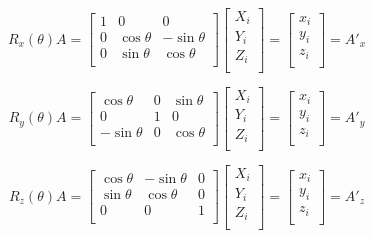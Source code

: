 \documentclass[12pt,a4paper]{article}
\begin{document}
\begin{equation}
R_{x}(\theta) A =
\begin{bmatrix}
1&0&0\\
0&\cos \theta&- \sin \theta \\
0&\sin \theta& \cos \theta \\
\end{bmatrix}
\begin{bmatrix}
X_i\\
Y_i\\
Z_i\\
\end{bmatrix}
=
\begin{bmatrix}
x_i\\
y_i\\
z_i\\
\end{bmatrix}
= A'_x
\end{equation}

\begin{equation}
R_{y}(\theta) A =
\begin{bmatrix}
\cos \theta&0& \sin \theta \\
0&1&0\\
-\sin \theta&0& \cos \theta \\
\end{bmatrix}
\begin{bmatrix}
X_i\\
Y_i\\
Z_i\\
\end{bmatrix}
=
\begin{bmatrix}
x_i\\
y_i\\
z_i\\
\end{bmatrix}
= A'_y
\end{equation}

\begin{equation}
R_{z}(\theta) A =
\begin{bmatrix}
\cos \theta&- \sin \theta&0 \\
\sin \theta& \cos \theta&0 \\
0&0&1 \\

\end{bmatrix}
\begin{bmatrix}
X_i\\
Y_i\\
Z_i\\
\end{bmatrix}
=
\begin{bmatrix}
x_i\\
y_i\\
z_i\\
\end{bmatrix}
= A'_z
\end{equation}
\end{document}
